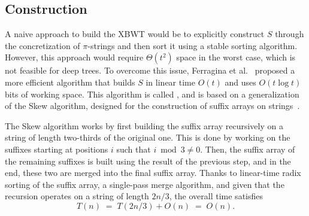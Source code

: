 \subsection{Construction}\label{sec:pathSort}
A naive approach to build the XBWT would be to explicitly construct $S$ through the concretization of $\pi$-strings and then sort it using a stable sorting algorithm. However, this approach would require $\Theta(t^2)$ space in the worst case, which is not feasible for deep trees. To overcome this issue, Ferragina et al.~\cite{ferragina2009compressing} proposed a more efficient algorithm that builds $S$ in linear time $O(t)$ and uses $O(t \log t)$ bits of working space.
This algorithm is called {\pathsort}, and is based on a generalization of the Skew algorithm, designed for the construction of suffix arrays on strings~\cite{karkkainen2006linear}.

The Skew algorithm works by first building the suffix array recursively on a string of length two-thirds of the original one.
This is done by working on the suffixes starting at positions $i$ such that $i \bmod 3 \neq 0$. 
Then, the suffix array of the remaining suffixes is built using the result of the previous step, and in the end, these two are merged into the final suffix array.
Thanks to linear-time radix sorting of the suffix array, a single-pass merge algorithm, and given that the recursion operates on a string of length $2n/3$, the overall time satisfies
\[
T(n) \;=\; T(2n/3) + O(n) \;=\; O(n).
\]

